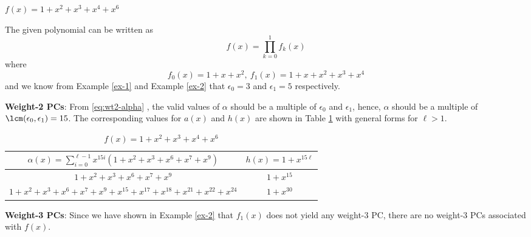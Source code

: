 \begin{example}
$f(x)=1+x^2+x^3+x^4+x^6$

The given polynomial can be written as 
$$f(x)=\prod_{k=0}^{1}f_k(x)$$
where 
$$f_0(x)=1+x+x^2,~f_1(x)=1+x+x^2+x^3+x^4$$ 
and we know from Example \ref{ex-1} and Example \ref{ex-2} that $\epsilon_0=3$ and $\epsilon_1=5$ respectively.

\textbf{Weight-2 PCs}: 
From \eqref{eq:wt2-alpha} , the valid values of $\alpha$ should be a multiple of $\epsilon_0$ and $\epsilon_1$, hence, $\alpha$ should be a multiple of $\lcm(\epsilon_0,\epsilon_1)=15$.
The corresponding values for $a(x)$ and $h(x)$ are shown in Table \ref{novelTab1-c} with general forms for $\ell>1$.

\begin{table}[htbp]
\renewcommand{\arraystretch}{1.3}
 \caption{$f(x)=1+x^2+x^3+x^4+x^6$}
 \centering
\begin{tabular}{c c } 
\hline
 $\alpha(x)=\sum_{i=0}^{\ell-1} x^{15i}(1+x^2+x^3+x^6+x^7+x^9)$ & $h(x)=1+x^{15\ell}$ \\ [0.5ex] 
\hline\hline
$1+x^2+x^3+x^6+x^7+x^9$ & $1+x^{15}$\\ 
$1+x^2+x^3+x^6+x^7+x^9+x^{15}+x^{17}+x^{18}+x^{21}+x^{22}+x^{24}$ & $1+x^{30}$ \\
\end{tabular}
 \label{novelTab1-c}
\end{table}

\textbf{Weight-3 PCs}:
Since we have shown in Example \ref{ex-2} that $f_1(x)$ does not yield any weight-3 PC, there are no weight-3 PCs associated with $f(x)$.
\label{ex-4}
\end{example}

